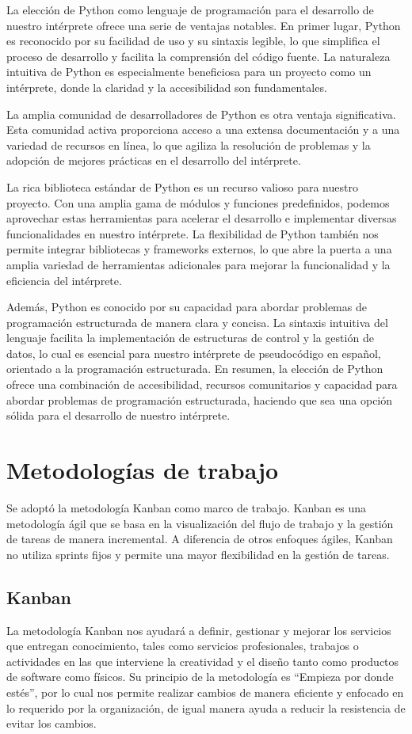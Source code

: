 La elección de Python como lenguaje de programación para el desarrollo de nuestro intérprete ofrece una serie de ventajas notables. En primer lugar, Python es reconocido por su facilidad de uso y su sintaxis legible, lo que simplifica el proceso de desarrollo y facilita la comprensión del código fuente. La naturaleza intuitiva de Python es especialmente beneficiosa para un proyecto como un intérprete, donde la claridad y la accesibilidad son fundamentales.

La amplia comunidad de desarrolladores de Python es otra ventaja significativa. Esta comunidad activa proporciona acceso a una extensa documentación y a una variedad de recursos en línea, lo que agiliza la resolución de problemas y la adopción de mejores prácticas en el desarrollo del intérprete.

La rica biblioteca estándar de Python es un recurso valioso para nuestro proyecto. Con una amplia gama de módulos y funciones predefinidos, podemos aprovechar estas herramientas para acelerar el desarrollo e implementar diversas funcionalidades en nuestro intérprete. La flexibilidad de Python también nos permite integrar bibliotecas y frameworks externos, lo que abre la puerta a una amplia variedad de herramientas adicionales para mejorar la funcionalidad y la eficiencia del intérprete.

Además, Python es conocido por su capacidad para abordar problemas de programación estructurada de manera clara y concisa. La sintaxis intuitiva del lenguaje facilita la implementación de estructuras de control y la gestión de datos, lo cual es esencial para nuestro intérprete de pseudocódigo en español, orientado a la programación estructurada. En resumen, la elección de Python ofrece una combinación de accesibilidad, recursos comunitarios y capacidad para abordar problemas de programación estructurada, haciendo que sea una opción sólida para el desarrollo de nuestro intérprete.

\section{Metodologías de trabajo}
Se adoptó la metodología Kanban como marco de trabajo. Kanban es una metodología ágil que se basa en la visualización del flujo de trabajo y la gestión de tareas de manera incremental. A diferencia de otros enfoques ágiles, Kanban no utiliza sprints fijos y permite una mayor flexibilidad en la gestión de tareas.

\subsection{Kanban}
La metodología Kanban nos ayudará a definir, gestionar y mejorar los servicios que entregan conocimiento, tales como servicios profesionales, trabajos o actividades en las que interviene la creatividad y el diseño tanto como productos de software como físicos. Su principio de la metodología es “Empieza por donde estés”, por lo cual nos permite realizar cambios de manera eficiente y enfocado en lo requerido por la organización, de igual manera ayuda a reducir la resistencia de evitar los cambios. \parencite{Garzas2011}


